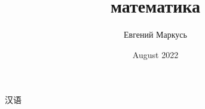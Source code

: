 \documentclass[a4paper]{article}
\title{математика}
\author{Евгений Маркусь}
\date{August 2022}
\begin{document}
汉语










\end{document}
